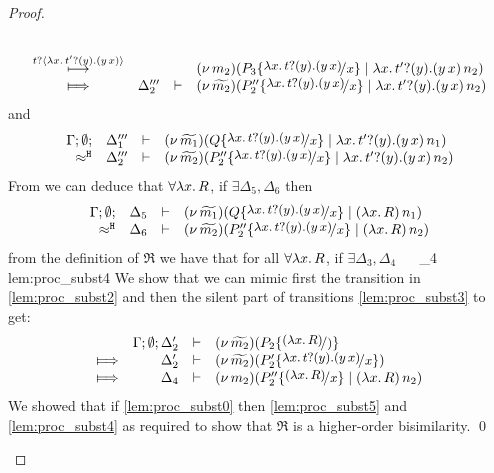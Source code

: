 \begin{proof}
\begin{enumerate}
\begin{itemize}
\begin{eqnarray}
\begin{array}{crll}
									\\
									{\hby{\bactinp{t}{\trvalx{t'}}}} &
												&&	\newsp{m_2}{P_3 \subst{\trvalx{t}}{x} \Par \appl{\trvalx{t'}}{n_2}}
									\\
									\Hby{}	& \Delta_2''' & \proves & \newsp{\widetilde{m_2}}{P_2'' \subst{\trvalx{t}}{x} \Par \appl{\trvalx{t'}}{n_2}}
								\end{array}
								\label{lem:proc_subst3}
							\end{eqnarray}
							and
							\begin{eqnarray*}
								\mhorel{\Gamma}{\Delta_1'''}{\newsp{\widetilde{m_1}}{Q \subst{\trvalx{t}}{x} \Par \appl{\trvalx{t'}}{n_1}}}
								{\hwb}
								{\Delta_2'''}{}{\newsp{\widetilde{m_2}}{P_2'' \subst{\trvalx{t}}{x} \Par \appl{\trvalx{t'}}{n_2}}}
							\end{eqnarray*}
							From  we can deduce that $\forall \lambda x.\,R$, if $\exists \Delta_5, \Delta_6$ then
							\begin{eqnarray*}
								\mhorel{\Gamma}{\Delta_5}{\newsp{\widetilde{m_1}}{Q \subst{\trvalx{t}}{x} \Par \appl{(\abs{x}{R})}{n_1}}}
								{\hwb}
								{\Delta_6}{}{\newsp{\widetilde{m_2}}{P_2'' \subst{\trvalx{t}}{x} \Par \appl{(\abs{x}{R})}{n_2}}}
							\end{eqnarray*}
							from the definition of $\Re$ we have that for all $\forall \lambda x.\,R$, if $\exists \Delta_3, \Delta_4$
								{\ \Re\ }
								{\Delta_4}{}
								{lem:proc_subst4}
							We show that we can mimic first the
							transition in \eqref{lem:proc_subst2} and then the silent part of
							transitions \eqref{lem:proc_subst3} to get:
							\begin{eqnarray}
								\begin{array}{crll}
											& \Gamma; \es; \Delta_2' &\proves& \newsp{\widetilde{m_2}}{P_2 \subst{(\abs{x}{R})}}
									\\
									\Hby{}	&	\Delta_2'			& \proves&	\newsp{\widetilde{m_2}}{P_2' \subst{\trvalx{t}}{x}}
									\\
									\Hby{} &	\Delta_4			& \proves&	\newsp{m_2}{P_2'' \subst{(\abs{x}{R})}{x} \Par \appl{(\abs{x}{R})}{n_2}}
								\end{array}
								\label{lem:proc_subst5}
							\end{eqnarray}
							We showed that if \eqref{lem:proc_subst0} then \eqref{lem:proc_subst5} and \eqref{lem:proc_subst4}
							as required to show that $\Re$ is a higher-order bisimilarity.
							\qed
				\end{itemize}
	\end{enumerate}
\end{proof}



